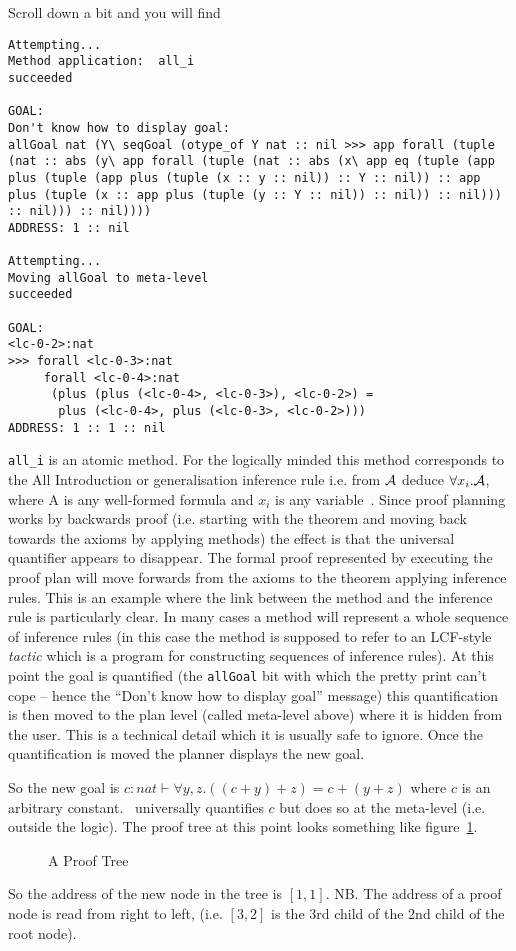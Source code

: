 Scroll down a bit and you will find 
\begin{verbatim}
Attempting... 
Method application:  all_i
succeeded

GOAL:
Don't know how to display goal:
allGoal nat (Y\ seqGoal (otype_of Y nat :: nil >>> app forall (tuple (nat :: abs (y\ app forall (tuple (nat :: abs (x\ app eq (tuple (app plus (tuple (app plus (tuple (x :: y :: nil)) :: Y :: nil)) :: app plus (tuple (x :: app plus (tuple (y :: Y :: nil)) :: nil)) :: nil))) :: nil))) :: nil))))
ADDRESS: 1 :: nil

Attempting... 
Moving allGoal to meta-level
succeeded

GOAL:
<lc-0-2>:nat
>>> forall <lc-0-3>:nat
     forall <lc-0-4>:nat
      (plus (plus (<lc-0-4>, <lc-0-3>), <lc-0-2>) =
       plus (<lc-0-4>, plus (<lc-0-3>, <lc-0-2>)))
ADDRESS: 1 :: 1 :: nil
\end{verbatim}
{\tt all\_i} is an atomic method.
For the logically minded this method corresponds to the All
Introduction or generalisation inference rule
i.e. from ${\cal A}$ deduce $\forall x_i. {\cal A}$, where {\cal A} is
any well-formed formula and $x_i$ is any variable~\cite{Hamilton78}.
Since proof planning works by backwards proof (i.e. starting with the
theorem and moving back towards the axioms by applying methods) the
effect is that the universal quantifier appears to disappear.  The
formal proof represented by executing the proof plan will move
forwards from the axioms to the theorem applying inference rules.
This is an example where the link between the method and the inference
rule is particularly clear.  In many cases a method will represent a
whole sequence of inference rules (in this case the method is supposed
to refer to an LCF-style {\em tactic} which is a program for
constructing sequences of inference rules).  At this point the goal is
quantified (the {\tt allGoal} bit with which the pretty
print can't cope -- hence the ``Don't know how to display goal''
message) this quantification is then moved to the plan level (called
meta-level above) where it is hidden from the user.  This is a
technical detail which it is usually safe to ignore.  Once
the quantification is moved the planner displays the new goal.

So the new goal is $c:nat \vdash \forall y, z. ((c + y) + z) = c + (y + z)$
where $c$ is an arbitrary constant.  \lclam\ universally quantifies
$c$ but does so at the meta-level (i.e. outside the logic).  The proof 
tree at this point looks something like figure~\ref{fig:proof_tree}.
\begin{figure}
\centerline{
        }
\caption{A Proof Tree}
\label{fig:proof_tree}
\end{figure}
So the address of the new node in the tree
is $[1, 1]$.  NB.  The address of a proof node is read from right to
left, (i.e. $[3, 2]$ is the 3rd child of the 2nd child of the root node).

